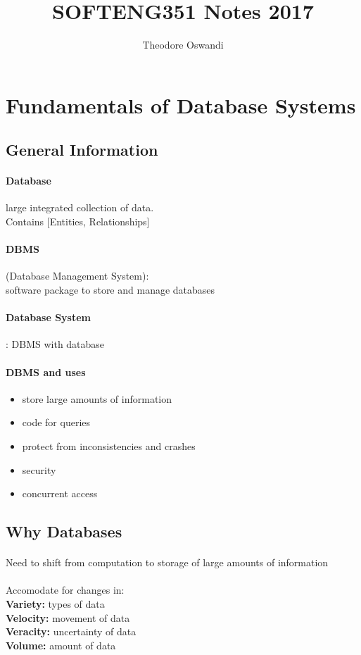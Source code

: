 \documentclass{article}
\title{SOFTENG351 Notes 2017}
\author{Theodore Oswandi}
\newcommand\tab[1][0.5cm]{\hspace*{#1}}
\begin{document}
 \maketitle{} 

\section{Fundamentals of Database Systems}
	\subsection{General Information}
		\paragraph{Database}
		large integrated collection of data. 
		\\ Contains [Entities, Relationships] 

		\paragraph{DBMS}(Database Management System): 
		\\ software package to store and manage databases

		\paragraph{Database System}: DBMS with database

		\paragraph{DBMS and uses}
		\begin{itemize}
			\item store large amounts of information
			\item code for queries
			\item protect from inconsistencies and crashes
			\item security
			\item concurrent access
		\end{itemize}

	\subsection{Why Databases}
		\paragraph{}
		Need to shift from computation to storage of large amounts of information
		\\ \\ Accomodate for changes in:
		\\ \tab \textbf{Variety:} types of data
		\\ \tab \textbf{Velocity:} movement of data
		\\ \tab \textbf{Veracity:} uncertainty of data
		\\ \tab \textbf{Volume:} amount of data
\end{document}
